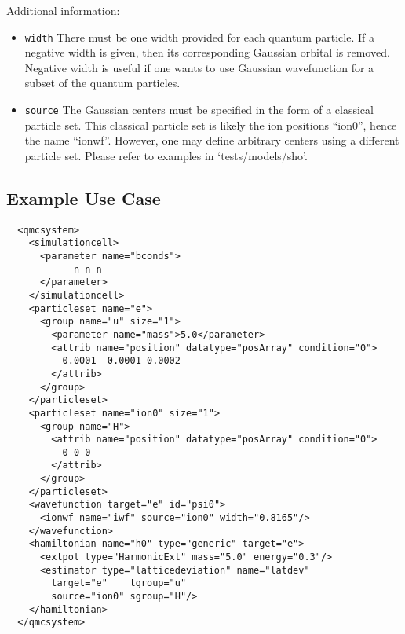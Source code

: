 \FloatBarrier

Additional information:
\begin{itemize}
\item \texttt{width} There must be one width provided for each quantum particle. If a negative width is given, then its corresponding Gaussian orbital is removed. Negative width is useful if one wants to use Gaussian wavefunction for a subset of the quantum particles.



\item \texttt{source} The Gaussian centers must be specified in the form of a classical particle set. This classical particle set is likely the ion positions ``ion0'', hence the name ``ionwf''. However, one may define arbitrary centers using a different particle set. Please refer to examples in `tests/models/sho'.



\end{itemize}

\subsection{Example Use Case}
\begin{lstlisting}
  <qmcsystem>
    <simulationcell>
      <parameter name="bconds">
            n n n
      </parameter>
    </simulationcell>
    <particleset name="e">
      <group name="u" size="1">
        <parameter name="mass">5.0</parameter>
        <attrib name="position" datatype="posArray" condition="0">
          0.0001 -0.0001 0.0002
        </attrib>
      </group>
    </particleset>
    <particleset name="ion0" size="1">
      <group name="H">
        <attrib name="position" datatype="posArray" condition="0">
          0 0 0
        </attrib>
      </group>
    </particleset>
    <wavefunction target="e" id="psi0">
      <ionwf name="iwf" source="ion0" width="0.8165"/>
    </wavefunction>
    <hamiltonian name="h0" type="generic" target="e">
      <extpot type="HarmonicExt" mass="5.0" energy="0.3"/>
      <estimator type="latticedeviation" name="latdev" 
        target="e"    tgroup="u" 
        source="ion0" sgroup="H"/>
    </hamiltonian>
  </qmcsystem>
\end{lstlisting}

